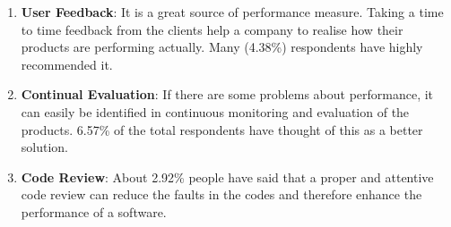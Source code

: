 \begin{enumerate}
    \item \textbf{User Feedback}: It is a great source of performance measure. Taking a time to time feedback from the clients help a company to realise how their products are performing actually. Many (4.38\%) respondents have highly recommended it.
    
    \item \textbf{Continual Evaluation}: If there are some problems about performance, it can easily be identified in continuous monitoring and evaluation of the products. 6.57\% of the total respondents have thought of this as a better solution.
    
    \item \textbf{Code Review}: About 2.92\% people have said that a proper and attentive code review can reduce the faults in the codes and therefore enhance the performance of a software.
\end{enumerate}

